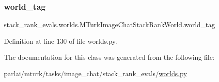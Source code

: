 \subsubsection{\texorpdfstring{world\+\_\+tag}{world\_tag}}
{\footnotesize\ttfamily stack\+\_\+rank\+\_\+evals.\+worlds.\+M\+Turk\+Image\+Chat\+Stack\+Rank\+World.\+world\+\_\+tag}



Definition at line 130 of file worlds.\+py.



The documentation for this class was generated from the following file\+:\begin{DoxyCompactItemize}
\item 
parlai/mturk/tasks/image\+\_\+chat/stack\+\_\+rank\+\_\+evals/\hyperlink{parlai_2mturk_2tasks_2image__chat_2stack__rank__evals_2worlds_8py}{worlds.\+py}\end{DoxyCompactItemize}
